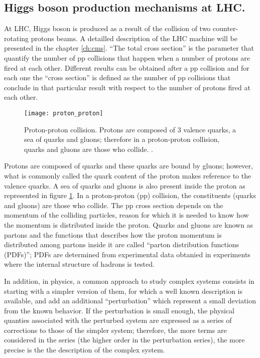 \subsection{Higgs boson production mechanisms at LHC.}

\noindent At LHC, Higgs boson is produced as a result of the collision of two counter-rotating protons beams. A detailled description of the LHC machine will be presented in the chapter \ref{ch:cms}. ``The total cross section'' is the parameter that quantify the number of pp collisions that happen when a number of protons are fired at each other. Different results can be obtained after a pp collision and for each one the ``cross section'' is defined as the number of pp collisions that conclude in that particular result with respect to the number of protons fired at each other.
\begin{figure}[!h]
\centering
\texttt{[image: proton\_proton]}
\caption[Proton-Proton collision]{Proton-proton collision. Protons are composed of 3 valence quarks, a sea of quarks and gluons; therefore in a proton-proton collision, quarks and gluons are those who collide. \cite{pp_coll}.}
\label{pp_collision}
\end{figure}

\noindent Protons are composed of quarks and these quarks are bound by gluons; however, what is commonly called the quark content of the proton makes reference to the valence quarks. A sea of quarks and gluons is also present inside the proton as represented in figure \ref{pp_collision}. In a proton-proton (pp) collision, the constituents (quarks and gluons) are those who collide. The pp cross section depends on the momentum of the colliding particles, reason for which it is needed to know how the momentum is distributed inside the proton. Quarks and gluons are known as partons and the functions that describes how the proton momentum is distributed among partons inside it are called ``parton distribution functions (PDFs)''; PDFs are determined from experimental data obtanied in experiments where the internal structure of hadrons is tested.

\noindent In addition, in physics, a common approach to study complex systems consists in starting with a simpler version of them, for which a well known description is available, and add an additional ``perturbation'' which represent a small deviation from the known behavior. If the perturbation is small enough, the physical quanties associated with the perturbed system are expressed as a series of corrections to those of the simpler system; therefore, the more terms are considered in the series (the higher order in the perturbation series), the more precise is the the description of the complex system.

